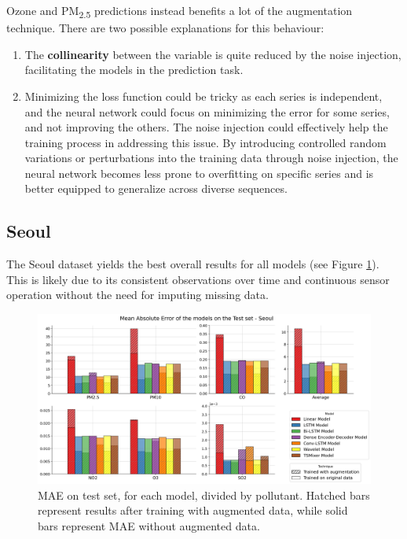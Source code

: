 Ozone and PM\textsubscript{2.5} predictions instead benefits a lot of the augmentation technique. There are two possible explanations for this behaviour:
\begin{enumerate}
    \item The \textbf{collinearity} between the variable is quite reduced by the noise injection, facilitating the models in the prediction task.
    \item Minimizing the loss function could be tricky as each series is independent, and the neural network could focus on minimizing the error for some series, and not improving the others. The noise injection could effectively help the training process in addressing this issue. By introducing controlled random variations or perturbations into the training data through noise injection, the neural network becomes less prone to overfitting on specific series and is better equipped to generalize across diverse sequences.
\end{enumerate}

\subsection{Seoul}

The Seoul dataset yields the best overall results for all models (see Figure \ref{fig:seoul_results}). This is likely due to its consistent observations over time and continuous sensor operation without the need for imputing missing data.

\begin{figure}[h]
    \centering
    \includegraphics[width=1\linewidth]{images/Results/Seoul_results.png}
    \caption{MAE on test set, for each model, divided by pollutant. Hatched bars represent results after training with augmented data, while solid bars represent MAE without augmented data.}
    \label{fig:seoul_results}
\end{figure}

